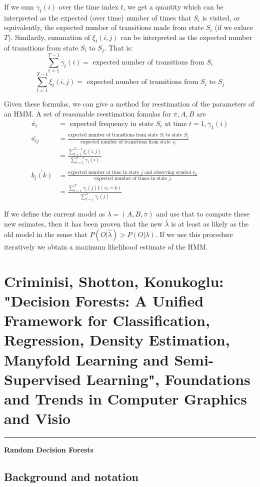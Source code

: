 \documentclass{scrartcl}
\begin{document}
\begin{appendices}
If we sum \(\gamma_t(i)\) over the time index \(t\), we get a quantity which can be interpreted as the expected (over time) number of times that \(S_i\) is visited, or equivalently, the expected number of transitions made from state \(S_i\) (if we exluce \(T\)). Similarily, summation of \(\xi_t(i,j)\) can be interpreted as the expected number of transitions from state \(S_i\) to \(S_j\). That is:
\[\sum_{t=1}^{T-1} \gamma_t(i) = \text{ expected number of transitions from } S_i\]
\[\sum_{t=1}^{T-1} \xi_t(i, j) = \text{ expected number of transitions from } S_i \text{ to } S_j\]

Given these formulas, we can give a method for reestimation of the parameters of an HMM. A set of reasonable reestimation fomulas for \(\pi, A, B\) are
\begin{align*}
    \bar{\pi_i} &= \text{ expected frequency in state } S_i \text{ at time } t=1, \gamma_1(i)\\ 
    \bar{a_{ij}} &= \frac{\text{expected number of transitions from state } S_i \text{ to state } S_j}{\text{expected number of transitions from state } s_i}\\
    &= \frac{\sum_{t=1}^{T-1} \xi_t(i, j)}{\sum_{t=1}^{T-1} \gamma_t(i)}\\
    \\
    \bar{b_j(k)} &= \frac{\text{expected number of time in state } j \text{ and observing symbol } v_k}{\text{expected number of times in state } j}\\
    &= \frac{\sum_{t=1}^T\gamma_t(j) 1(v_t = k)}{\sum_{t=1}^T\gamma_t(j)}
\end{align*}

If we define the current model as \(\lambda = (A,B, \pi)\) and use that to compute these new esimates, then it has been proven that the new \(\bar{\lambda}\) is at least as likely as the old model in the sense that \(P(O|\hat{\lambda}) > P(O|\lambda)\). If we use this procedure iteratively we obtain a maximum likelihood estimate of the HMM.
\newpage

\section{Criminisi, Shotton, Konukoglu: "Decision Forests: A Unified Framework for Classification, Regression, Density Estimation, Manyfold Learning and Semi-Supervised Learning", Foundations and Trends in Computer Graphics and Visio}

\rule{\textwidth}{1pt}
\textbf{Random Decision Forests}
\subsection{Background and notation}

\end{appendices}
\end{document}
